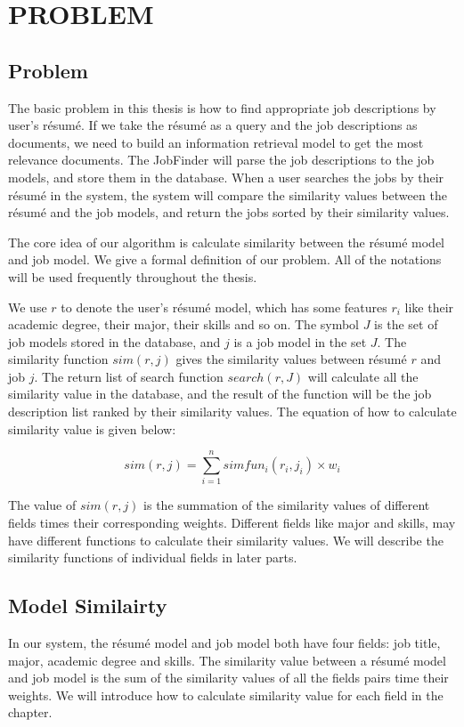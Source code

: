 \chapter{PROBLEM}

\section{Problem}
The basic problem in this thesis is how to find appropriate job descriptions by user's r\'esum\'e. If we take the r\'esum\'e as a query and the job descriptions as documents, we need to build an information retrieval model to get the most relevance documents.  The JobFinder will parse the job descriptions to the job models, and store them in the database. When a user searches the jobs by their r\'esum\'e in the system, the system will compare the similarity values between the r\'esum\'e and the job models, and return the jobs sorted by their similarity values.

The core idea of our algorithm is calculate similarity between the r\'esum\'e model and job model.
We give a formal definition of our problem. All of the notations will be used frequently throughout the thesis.

We use $r$ to denote the user's r\'esum\'e model, which has some features $r_i$ like their academic degree, their major, their skills and so on. The symbol $J$ is the set of job models stored in the database, and $j$ is a job model in the set $J$. The similarity function $sim(r, j)$ gives the similarity values between r\'esum\'e $r$ and job $j$. The return list of search function $search(r,J)$ will calculate all the similarity value in the database, and the result of the function will be the job description list ranked by their similarity values. The equation of how to calculate similarity value is given below:

$$ sim(r, j) = \sum_{i=1}^{n} simfun_i(r_i,j_i) \times w_i $$

The value of $sim(r, j)$ is the summation of the similarity values of different fields times their corresponding weights. Different fields like major and skills,  may have different functions to calculate their similarity values. We will describe the similarity functions of individual fields in later parts.


\section{Model Similairty}

In our system, the r\'esum\'e model and job model both have four fields: job title, major, academic degree and skills. The similarity value between a r\'esum\'e model and job model is the sum of the similarity values of all the fields pairs time their weights. We will introduce how to calculate similarity value for each field in the chapter.

